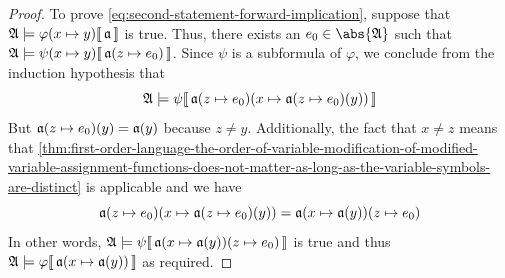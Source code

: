 \begin{proof}
    \vspace{0.3cm}
    \noindent
    To prove \eqref{eq:second-statement-forward-implication}, suppose that \( \folwffsatisfaction{\mathfrak{A}}{ \folfreevariablereplacement{\varphi}{x}{y} }{\mathfrak{a}} \)
    is true. Thus, there exists an \( e_{0} \in \abs{\mathfrak{A}} \) such that
    \( \folwffsatisfaction{\mathfrak{A}}{ \folfreevariablereplacement{\psi}{x}{y} }{ \folmodifiedvariableassignmentfunction{\mathfrak{a}}{z}{e_{0}} } \).
    Since \( \psi \) is a subformula of \( \varphi \), we conclude from the induction hypothesis that
    \begin{equation*}
        \folwffsatisfaction{\mathfrak{A}}{\psi}{ \folmodifiedvariableassignmentfunction{ \folmodifiedvariableassignmentfunction{\mathfrak{a}}{z}{e_{0}} }{x}{ \folmodifiedvariableassignmentfunction{\mathfrak{a}}{z}{e_{0}}(y) } }
    \end{equation*}
    But \( \folmodifiedvariableassignmentfunction{\mathfrak{a}}{z}{e_{0}}(y) = \mathfrak{a}(y) \) because \( z \neq y \).
    Additionally, the fact that \( x \neq z \) means that \cref{thm:first-order-language-the-order-of-variable-modification-of-modified-variable-assignment-functions-does-not-matter-as-long-as-the-variable-symbols-are-distinct} is applicable and we have
    \begin{equation*}
        \folmodifiedvariableassignmentfunction{ \folmodifiedvariableassignmentfunction{\mathfrak{a}}{z}{e_{0}} }{x}{ \folmodifiedvariableassignmentfunction{\mathfrak{a}}{z}{e_{0}}(y) } =
        \folmodifiedvariableassignmentfunction{ \folmodifiedvariableassignmentfunction{\mathfrak{a}}{x}{\mathfrak{a}(y)} }{z}{e_{0}}
    \end{equation*}
    In other words, \( \folwffsatisfaction{\mathfrak{A}}{\psi}{ \folmodifiedvariableassignmentfunction{ \folmodifiedvariableassignmentfunction{\mathfrak{a}}{x}{\mathfrak{a}(y)} }{z}{e_{0}} }  \) is true and thus \( \folwffsatisfaction{\mathfrak{A}}{\varphi}{ \folmodifiedvariableassignmentfunction{\mathfrak{a}}{x}{\mathfrak{a}(y)} } \) as required.


\end{proof}
